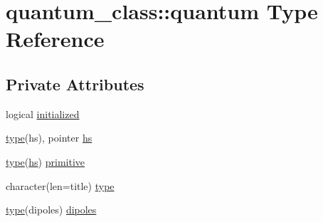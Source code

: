 \hypertarget{structquantum__class_1_1quantum}{\section{quantum\-\_\-class\-:\-:quantum Type Reference}
\label{structquantum__class_1_1quantum}
}
\subsection*{Private Attributes}
\begin{DoxyCompactItemize}
\item 
logical \hyperlink{structquantum__class_1_1quantum_a2900a58a734e38e761bd1d8c60b4b81f}{initialized}
\item 
\hyperlink{structquantum__class_1_1quantum_aa222a9bd02a7dd3f8b37cdbcd33a6d74}{type}(hs), pointer \hyperlink{structquantum__class_1_1quantum_a3fc38910e311bd6d449279fb2ac7288a}{hs}
\item 
\hyperlink{structquantum__class_1_1quantum_aa222a9bd02a7dd3f8b37cdbcd33a6d74}{type}(\hyperlink{structquantum__class_1_1quantum_a3fc38910e311bd6d449279fb2ac7288a}{hs}) \hyperlink{structquantum__class_1_1quantum_a285ebdf853c486f65ce55d6f45e65720}{primitive}
\item 
character(len=title) \hyperlink{structquantum__class_1_1quantum_aa222a9bd02a7dd3f8b37cdbcd33a6d74}{type}
\item 
\hyperlink{structquantum__class_1_1quantum_aa222a9bd02a7dd3f8b37cdbcd33a6d74}{type}(dipoles) \hyperlink{structquantum__class_1_1quantum_a987a3ad91de3703c7468ce14d9ba872c}{dipoles}
\end{DoxyCompactItemize}


